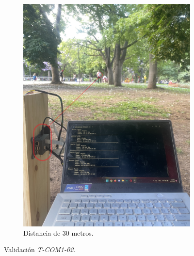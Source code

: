 \begin{figure}[H]
\begin{subfigure}{0.3\textwidth}
		\includegraphics[width=\linewidth]{ImagenesValidacion del prototipo/TINTCOM12ca}
		\caption{Distancia de 30 metros.}
	\end{subfigure}
	\caption{Validación \textit{T-COM1-02}.}
\end{figure}

